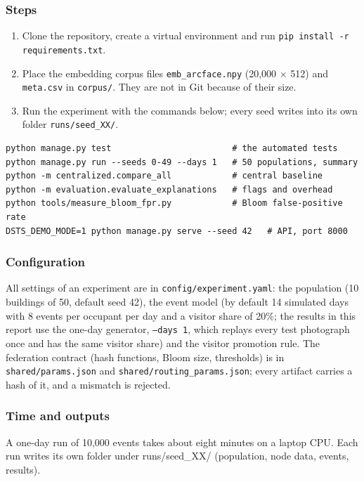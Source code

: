 \documentclass[12pt,a4paper,oneside]{report}
\begin{document}
\subsubsection{Steps}
\begin{enumerate}
\item Clone the repository, create a virtual environment and run \texttt{pip install -r requirements.txt}.
\item Place the embedding corpus files \texttt{emb\_\allowbreak arcface.npy} (20,000 $\times$ 512) and \texttt{meta.csv} in \texttt{corpus/}. They are not in Git because of their size.
\item Run the experiment with the commands below; every seed writes into its own folder \texttt{runs/seed\_\allowbreak XX/}.
\end{enumerate}
\begin{footnotesize}
\begin{verbatim}
python manage.py test                        # the automated tests
python manage.py run --seeds 0-49 --days 1   # 50 populations, summary
python -m centralized.compare_all            # central baseline
python -m evaluation.evaluate_explanations   # flags and overhead
python tools/measure_bloom_fpr.py            # Bloom false-positive rate
DSTS_DEMO_MODE=1 python manage.py serve --seed 42   # API, port 8000
\end{verbatim}
\end{footnotesize}

\subsubsection{Configuration}
All settings of an experiment are in \texttt{config/experiment.yaml}: the population (10 buildings of 50, default seed 42), the event model (by default 14 simulated days with 8 events per occupant per day and a visitor share of 20\%; the results in this report use the one-day generator, \texttt{--days 1}, which replays every test photograph once and has the same visitor share) and the visitor promotion rule. The federation contract (hash functions, Bloom size, thresholds) is in \texttt{shared/params.json} and \texttt{shared/routing\_\allowbreak params.json}; every artifact carries a hash of it, and a mismatch is rejected.

\subsubsection{Time and outputs}
A one-day run of 10,000 events takes about eight minutes on a laptop CPU. Each run writes its own folder under runs/seed\_\allowbreak XX/ (population, node data, events, results).
\end{document}
